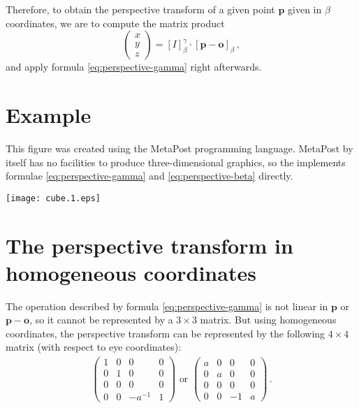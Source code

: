 \documentclass[12pt]{article}
\providecommand{\po}{\mathbf{o}}
\providecommand{\pp}{\mathbf{p}}
\begin{document}
Therefore, to obtain the perspective transform of a given point $\pp$
given in $\beta$ coordinates, we are to compute the matrix product
\begin{equation}
\label{eq:perspective-beta}
\begin{pmatrix}
x \\
y \\
z 
\end{pmatrix} = [I]^\gamma_\beta  \cdot [\pp - \po]_\beta\,,
\end{equation}
and apply formula \eqref{eq:perspective-gamma} right afterwards.

\section{Example}

This figure was created using the MetaPost programming language.
MetaPost by itself has no facilities to produce three-dimensional graphics,
so the  implements formulae \eqref{eq:perspective-gamma} and \eqref{eq:perspective-beta} directly.

\begin{center}
\texttt{[image: cube.1.eps]}
\end{center}

\section{The perspective transform in homogeneous coordinates}

The operation described by formula \eqref{eq:perspective-gamma} 
is not linear in $\pp$
or $\pp - \po$, so it cannot be represented by a $3\times 3$ matrix.
But using homogeneous coordinates, the perspective transform
can be represented by the following $4 \times 4$ matrix
(with respect to eye coordinates):
\begin{align*}
\begin{pmatrix}
1 & 0 & 0 & 0 \\
0 & 1 & 0 & 0 \\
0 & 0 & 0 & 0 \\
0 & 0 & -a^{-1} & 1
\end{pmatrix}
\text{ or }
\begin{pmatrix}
a & 0 & 0 & 0 \\
0 & a & 0 & 0 \\
0 & 0 & 0 & 0 \\
0 & 0 & -1 & a
\end{pmatrix}\,.
\end{align*}
\end{document}
